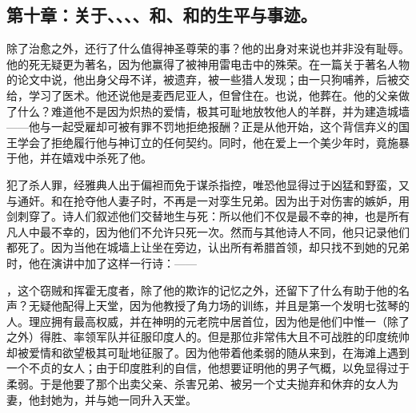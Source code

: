 
\subsection{第十章：关于、、、、和、和的生平与事迹。}

除了治愈之外，还行了什么值得神圣尊荣的事？他的出身对来说也并非没有耻辱。他的死无疑更为著名，因为他赢得了被神用雷电击中的殊荣。在一篇关于著名人物的论文中说，他出身父母不详，被遗弃，被一些猎人发现；由一只狗哺养，后被交给，学习了医术。他还说他是麦西尼亚人，但曾住在。也说，他葬在。他的父亲做了什么？难道他不是因为炽热的爱情，极其可耻地放牧他人的羊群，并为建造城墙——他与一起受雇却可被有罪不罚地拒绝报酬？正是从他开始，这个背信弃义的国王学会了拒绝履行他与神订立的任何契约。同时，他在爱上一个美少年时，竟施暴于他，并在嬉戏中杀死了他。\par

犯了杀人罪，经雅典人出于偏袒而免于谋杀指控，唯恐他显得过于凶猛和野蛮，又与通奸。和在抢夺他人妻子时，不再是一对孪生兄弟。因为出于对伤害的嫉妒，用剑刺穿了。诗人们叙述他们交替地生与死：所以他们不仅是最不幸的神，也是所有凡人中最不幸的，因为他们不允许只死一次。然而与其他诗人不同，他只记录他们都死了。因为当他在城墙上让坐在旁边，认出所有希腊首领，却只找不到她的兄弟时，他在演讲中加了这样一行诗：——\par

\par

，这个窃贼和挥霍无度者，除了他的欺诈的记忆之外，还留下了什么有助于他的名声？无疑他配得上天堂，因为他教授了角力场的训练，并且是第一个发明七弦琴的人。理应拥有最高权威，并在神明的元老院中居首位，因为他是他们中惟一（除了之外）得胜、率领军队并征服印度人的。但是那位非常伟大且不可战胜的印度统帅却被爱情和欲望极其可耻地征服了。因为他带着他柔弱的随从来到，在海滩上遇到一个不贞的女人；由于印度胜利的自信，他想要证明他的男子气概，以免显得过于柔弱。于是他要了那个出卖父亲、杀害兄弟、被另一个丈夫抛弃和休弃的女人为妻，他封她为，并与她一同升入天堂。\par

